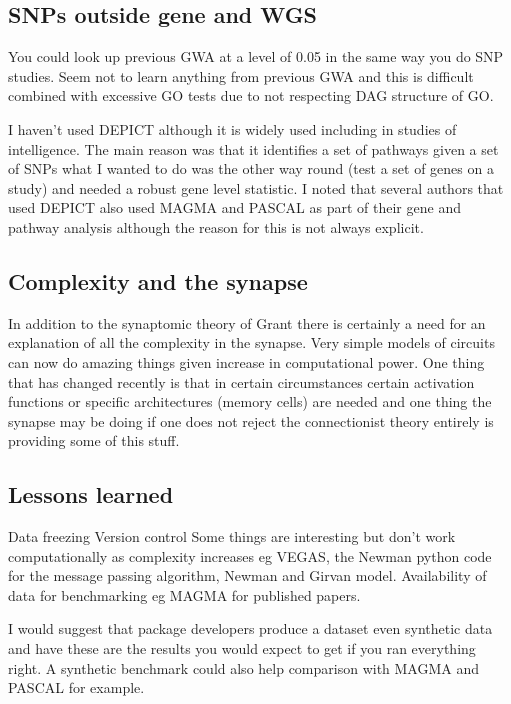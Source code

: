  \subsection{SNPs outside gene and WGS}
 
 
 
 
 
 You could look up previous GWA at a level of 0.05 in the same way you do SNP studies. Seem not to learn anything from previous GWA and this is difficult combined with excessive GO tests due to not respecting DAG structure of GO.
 
 I haven't used DEPICT although it is widely used including in studies of intelligence. The main reason was that it identifies a set of pathways given a set of SNPs what I wanted to do was the other way round (test a set of genes on a study) and needed a robust gene level statistic. I noted that several authors that used DEPICT also used MAGMA and PASCAL as part of their gene and pathway analysis although the reason for this is not always explicit. 
 
 
 \subsection{Complexity and the synapse}
 In addition to the synaptomic theory of Grant there is certainly a need for an explanation of all the complexity in the synapse. Very simple models of circuits can now do amazing things given increase in computational power. One thing that has changed recently is that in certain circumstances certain activation functions or specific architectures (memory cells) are needed and one thing the synapse may be doing if one does not reject the connectionist theory entirely is providing some of this stuff. 
 
 \subsection{Lessons learned}
 Data freezing
 Version control 
 Some things are interesting but don't work computationally as complexity increases eg VEGAS, the Newman python code for the message passing algorithm, Newman and Girvan model. 
 Availability of data for benchmarking eg MAGMA for published papers. 
 
 I would suggest that package developers produce a dataset even synthetic data and have these are the results you would expect to get if you ran everything right. A synthetic benchmark could also help comparison with MAGMA and PASCAL for example. 
 
